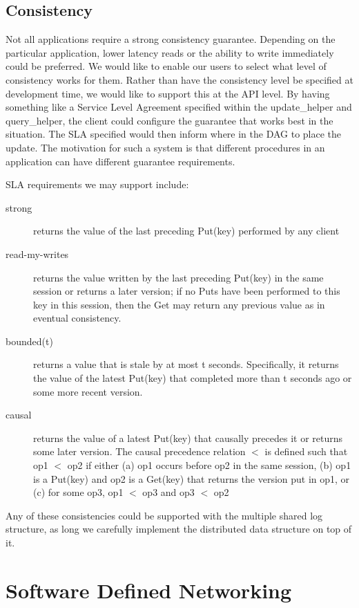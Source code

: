 \documentclass[letterpaper,twocolumn,10pt]{article}
\begin{document}
\subsection{Consistency}

Not all applications require a strong consistency guarantee. Depending on the particular application, lower latency reads or the ability to write immediately could be preferred. We would like to enable our users to select what level of consistency works for them. Rather than have the consistency level be specified at development time, we would like to support this at the API level. By having something like a Service Level Agreement specified within the update\_helper and query\_helper, the client could configure the guarantee that works best in the situation. The SLA specified would then inform where in the DAG to place the update. The motivation for such a system is that different procedures in an application can have different guarantee requirements.

SLA requirements we may support include: \cite{SLA}

\begin{description}
\item[strong] returns the value of the last preceding Put(key) performed by any client
\item[read-my-writes] returns the value written by the last preceding Put(key) in the same session or returns a later version; if no Puts have been performed to this key in this session, then the Get may return any previous value as in eventual consistency.
\item[bounded(t)] returns a value that is stale by at most t seconds. Specifically, it returns the value of the latest Put(key) that completed more than t seconds ago or some more recent version.
\item[causal] returns the value of a latest Put(key) that causally precedes it or returns some later version. The causal precedence relation $<$ is defined such that op1 $<$ op2 if either
(a) op1 occurs before op2 in the same session,
(b) op1 is a Put(key) and op2 is a Get(key) that
returns the version put in op1, or
(c) for some op3, op1 $<$ op3 and op3 $<$ op2
\end{description}

Any of these consistencies could be supported with the multiple shared log structure, as long we carefully implement the distributed data structure on top of it.

\section{Software Defined Networking}
\end{document}
